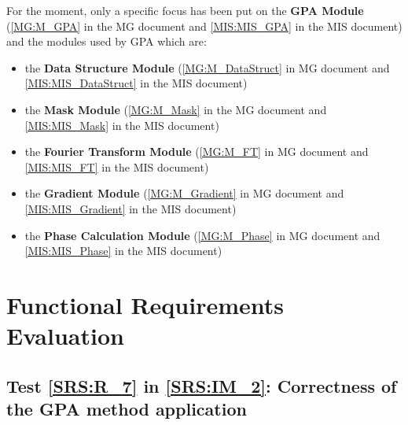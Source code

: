 \documentclass[12pt, titlepage]{article}
\begin{document}
For the moment, only a specific focus has been put on the \textbf{GPA Module} (\cref{MG:M_GPA} in the  MG document and \cref{MIS:MIS_GPA} in the MIS document) and the modules used by GPA which are:
\begin{itemize}
\item the \textbf{Data Structure Module} (\cref{MG:M_DataStruct} in MG document and \cref{MIS:MIS_DataStruct} in the MIS document)
\item the \textbf{Mask Module} (\cref{MG:M_Mask} in the MG document and \cref{MIS:MIS_Mask} in the MIS document)
\item the \textbf{Fourier Transform Module} (\cref{MG:M_FT} in MG document and \cref{MIS:MIS_FT} in the MIS document)
\item the \textbf{Gradient Module} (\cref{MG:M_Gradient} in MG document and \cref{MIS:MIS_Gradient} in the MIS document)
\item the \textbf{Phase Calculation Module} (\cref{MG:M_Phase} in MG document and \cref{MIS:MIS_Phase} in the MIS document)
\end{itemize}

\section{Functional Requirements Evaluation}

\subsection{\textbf{Test \cref{SRS:R_7} in \cref{SRS:IM_2}}: Correctness of the GPA method application}
\end{document}
